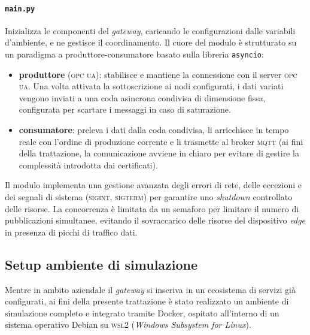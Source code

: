 \documentclass[12pt]{article}
\begin{document}
    \paragraph{\texttt{main.py}} Inizializza le componenti del \textit{gateway}, caricando le configurazioni dalle variabili d'ambiente, e ne gestisce il coordinamento. Il cuore del modulo è strutturato su un paradigma a produttore-consumatore basato sulla libreria \verb|asyncio|:
        \begin{itemize}
            \item \textbf{produttore} (\textsc{opc ua}): stabilisce e mantiene la connessione con il server \textsc{opc ua}. Una volta attivata la sottoscrizione ai nodi configurati, i dati variati vengono inviati a una coda asincrona condivisa di dimensione fissa, configurata per scartare i messaggi in caso di saturazione.
            \item \textbf{consumatore}: preleva i dati dalla coda condivisa, li arricchisce in tempo reale con l'ordine di produzione corrente e li trasmette al broker \textsc{mqtt} (ai fini della trattazione, la comunicazione avviene in chiaro per evitare di gestire la complessità introdotta dai certificati).
        \end{itemize}
    Il modulo implementa una gestione avanzata degli errori di rete, delle eccezioni e dei segnali di sistema (\textsc{sigint}, \textsc{sigterm}) per garantire uno \textit{shutdown} controllato delle risorse. La concorrenza è limitata da un semaforo per limitare il numero di pubblicazioni simultanee, evitando il sovraccarico delle risorse del dispositivo \textit{edge} in presenza di picchi di traffico dati.
    
    \subsection{Setup ambiente di simulazione}
    
    Mentre in ambito aziendale il \textit{gateway} si inseriva in un ecosistema di servizi già configurati, ai fini della presente trattazione è stato realizzato un ambiente di simulazione completo e integrato tramite Docker, ospitato all'interno di un sistema operativo Debian su \textsc{wsl2} (\textit{Windows Subsystem for Linux}).
\end{document}
